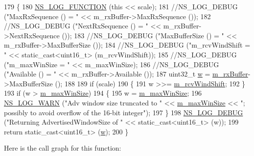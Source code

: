 \begin{DoxyCode}
179 \{
180   \hyperlink{log-macros-disabled_8h_a90b90d5bad1f39cb1b64923ea94c0761}{NS\_LOG\_FUNCTION} (\textcolor{keyword}{this} << scale);
181   \textcolor{comment}{//NS\_LOG\_DEBUG ("MaxRxSequence () = " << m\_rxBuffer->MaxRxSequence ());}
182   \textcolor{comment}{//NS\_LOG\_DEBUG ("NextRxSequence () = " << m\_rxBuffer->NextRxSequence ());}
183   \textcolor{comment}{//NS\_LOG\_DEBUG ("MaxBufferSize () = " << m\_rxBuffer->MaxBufferSize ());}
184   \textcolor{comment}{//NS\_LOG\_DEBUG ("m\_rcvWindShift = " << static\_cast<uint16\_t> (m\_rcvWindShift));}
185   \textcolor{comment}{//NS\_LOG\_DEBUG ("m\_maxWinSize = " << m\_maxWinSize);}
186   \textcolor{comment}{//NS\_LOG\_DEBUG ("Available () = " << m\_rxBuffer->Available ());}
187   uint32\_t \hyperlink{lte_2model_2fading-traces_2fading__trace__generator_8m_afd61ec66f9d7b807eece6eb12c781844}{w} = \hyperlink{classns3_1_1TcpSocketBase_a0163894148e5a70e6bd89970a1483fae}{m\_rxBuffer}->MaxBufferSize ();
188 
189   \textcolor{keywordflow}{if} (scale)
190     \{
191       w >>= \hyperlink{classns3_1_1TcpSocketBase_a045fc4c0c16f906c5ec43d853cdb599f}{m\_rcvWindShift};
192     \}
193   \textcolor{keywordflow}{if} (w > \hyperlink{classns3_1_1TcpSocketBase_a045897aa710b2ad3e99cefd66e8dc168}{m\_maxWinSize})
194     \{
195       w = \hyperlink{classns3_1_1TcpSocketBase_a045897aa710b2ad3e99cefd66e8dc168}{m\_maxWinSize};
196       \hyperlink{group__logging_gade7208b4009cdf0e25783cd26766f559}{NS\_LOG\_WARN} (\textcolor{stringliteral}{"Adv window size truncated to "} << \hyperlink{classns3_1_1TcpSocketBase_a045897aa710b2ad3e99cefd66e8dc168}{m\_maxWinSize} << \textcolor{stringliteral}{"; possibly to
       avoid overflow of the 16-bit integer"});
197     \}
198   \hyperlink{group__logging_ga413f1886406d49f59a6a0a89b77b4d0a}{NS\_LOG\_DEBUG} (\textcolor{stringliteral}{"Returning AdvertisedWindowSize of "} << static\_cast<uint16\_t> (w));
199   \textcolor{keywordflow}{return} \textcolor{keyword}{static\_cast<}uint16\_t\textcolor{keyword}{>} (\hyperlink{lte_2model_2fading-traces_2fading__trace__generator_8m_afd61ec66f9d7b807eece6eb12c781844}{w});
200 \}
\end{DoxyCode}


Here is the call graph for this function\+:


